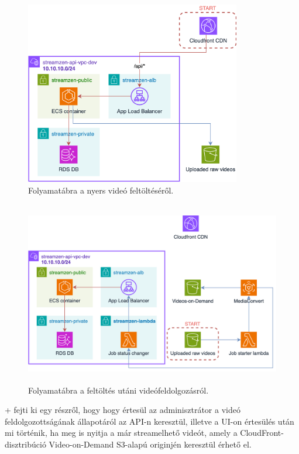 \begin{figure}[h]
	\centering
	\includegraphics[height=80mm, keepaspectratio]{figures/dipterv_vod1.png}
	\caption{Folyamatábra a nyers videó feltöltéséről.}
	\label{fig:vod1}
\end{figure}

\begin{figure}[h]
	\centering
	\includegraphics[height=80mm, keepaspectratio]{figures/dipterv_vod2.png}
	\caption{Folyamatábra a feltöltés utáni videófeldolgozásról.}
	\label{fig:vod2}
\end{figure}

\Az+ fejti ki egy részről, hogy hogy értesül az adminisztrátor a videó feldolgozottságának állapotáról az API-n keresztül, illetve a UI-on értesülés után mi történik, ha meg is nyitja a már streamelhető videót, amely a CloudFront-disztribúció Video-on-Demand S3-alapú originjén keresztül érhető el.


